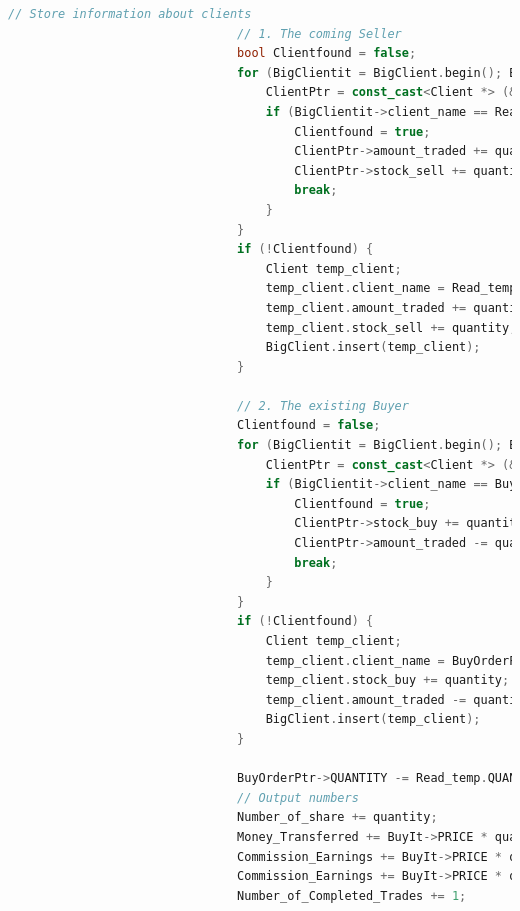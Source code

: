 \documentclass{article}
\begin{document}
\begin{lstlisting}[language=C++]
                                // Store information about clients
                                // 1. The coming Seller
                                bool Clientfound = false;
                                for (BigClientit = BigClient.begin(); BigClientit != BigClient.end(); BigClientit++) {
                                    ClientPtr = const_cast<Client *> (&(*BigClientit));
                                    if (BigClientit->client_name == Read_temp.CLIENT_NAME) {
                                        Clientfound = true;
                                        ClientPtr->amount_traded += quantity * BuyIt->PRICE;
                                        ClientPtr->stock_sell += quantity;
                                        break;
                                    }
                                }
                                if (!Clientfound) {
                                    Client temp_client;
                                    temp_client.client_name = Read_temp.CLIENT_NAME;
                                    temp_client.amount_traded += quantity * BuyIt->PRICE;
                                    temp_client.stock_sell += quantity;
                                    BigClient.insert(temp_client);
                                }

                                // 2. The existing Buyer
                                Clientfound = false;
                                for (BigClientit = BigClient.begin(); BigClientit != BigClient.end(); BigClientit++) {
                                    ClientPtr = const_cast<Client *> (&(*BigClientit));
                                    if (BigClientit->client_name == BuyOrderPtr->CLIENT_NAME) {
                                        Clientfound = true;
                                        ClientPtr->stock_buy += quantity;
                                        ClientPtr->amount_traded -= quantity * BuyIt->PRICE;
                                        break;
                                    }
                                }
                                if (!Clientfound) {
                                    Client temp_client;
                                    temp_client.client_name = BuyOrderPtr->CLIENT_NAME;
                                    temp_client.stock_buy += quantity;
                                    temp_client.amount_traded -= quantity * BuyIt->PRICE;
                                    BigClient.insert(temp_client);
                                }

                                BuyOrderPtr->QUANTITY -= Read_temp.QUANTITY;
                                // Output numbers
                                Number_of_share += quantity;
                                Money_Transferred += BuyIt->PRICE * quantity;
                                Commission_Earnings += BuyIt->PRICE * quantity / 100;
                                Commission_Earnings += BuyIt->PRICE * quantity / 100;
                                Number_of_Completed_Trades += 1;


\end{lstlisting}
\end{document}
